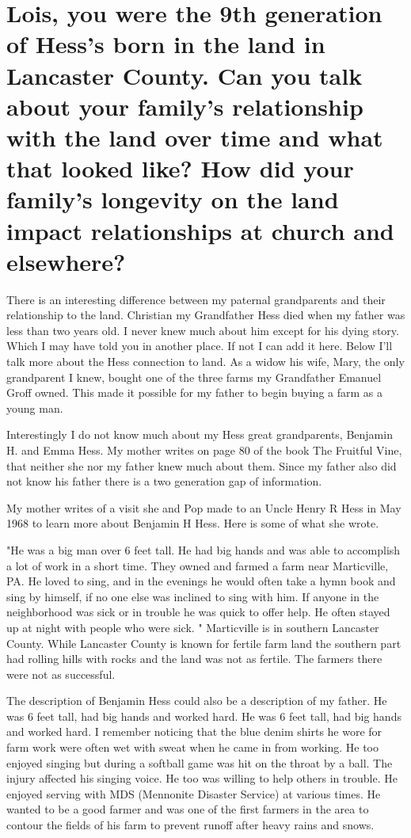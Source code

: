 \section{Lois, you were the 9th generation of Hess's born in the land in Lancaster County.
Can you talk about your family's relationship with the land over time and what that looked like? How did your family's longevity on the land impact relationships at church and elsewhere?}
There is an interesting difference between my paternal grandparents and their relationship to the land.
Christian my Grandfather Hess died when my father was less than two years old.
I never knew much about him except for his dying story.
Which I may have told you in another place.
If not I can add it here.
Below I'll talk more about the Hess connection to land.
As a widow his wife, Mary, the only grandparent I knew, bought one of the three farms my Grandfather Emanuel Groff owned.
This made it possible for my father to begin buying a farm as a young man.

Interestingly I do not know much about my Hess great grandparents, Benjamin H.
and Emma Hess.
My mother writes on page 80 of the book The Fruitful Vine, that neither she nor my father knew much about them.
Since my father also did not know his father there is a two generation gap of information.

My mother writes of a visit she and Pop made to an Uncle Henry R Hess in May 1968 to learn more about Benjamin H Hess.
Here is some of what she wrote.

      "He was a big man over 6 feet tall.
He had big hands and was able to accomplish a lot of work in a short time.
They owned and farmed a farm near Marticville, PA.
He loved to sing, and in the evenings he would often take a hymn book and sing by himself, if no one else was inclined to sing with him.
If anyone in the neighborhood was sick or in trouble he was quick to offer help.
He often stayed up at night with people who were sick.
"
Marticville is in southern Lancaster County.
While Lancaster County is known for fertile farm land the southern part had rolling hills with rocks and the land was not as fertile.
The farmers there were not as successful.

The description of Benjamin Hess could also be a description of my father.
He was 6 feet tall, had big hands and worked hard.
He was 6 feet tall, had big hands and worked hard.
I remember noticing that the blue denim shirts he wore for farm work were often wet with sweat when he came in from working.
He too enjoyed singing but during a softball game was hit on the throat by a ball.
The injury affected his singing voice.
He too was willing to help others in trouble.
He enjoyed serving with MDS (Mennonite Disaster Service) at various times.
He wanted to be a good farmer and was one of the first farmers in the area to contour the fields of his farm to prevent runoff after heavy rains and snows.

